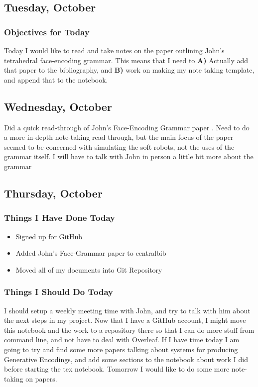 \documentclass[letterpaper,oneside,titlepage]{article}
\begin{document}
\subsection*{Tuesday, October }
\subsubsection*{Objectives for Today}
Today I would like to read and take notes on the paper outlining John's tetrahedral face-encoding grammar.  This means that I need to \textbf{A)} Actually add that paper to the bibliography, and \textbf{B)} work on making my note taking template, and append that to the notebook.

\subsection*{Wednesday, October }
Did a quick read-through of John's Face-Encoding Grammar paper \cite{Rieffel:face-grammar}.  Need to do a more in-depth note-taking read through, but the main focus of the paper seemed to be concerned with simulating the soft robots, not the uses of the grammar itself.  I will have to talk with John in person a little bit more about the grammar

\subsection*{Thursday, October }
\subsubsection*{Things I Have Done Today}
\begin{itemize}
\item Signed up for GitHub
\item Added John's Face-Grammar paper to centralbib
\item Moved all of my documents into Git Repository
\end{itemize}
\subsubsection*{Things I Should Do Today}
I should setup a weekly meeting time with John, and try to talk with him about the next steps in my project.  Now that I have a GitHub account, I might move this notebook and the work to a repository there so that I can do more stuff from command line, and not have to deal with Overleaf.  If I have time today I am going to try and find some more papers talking about systems for producing Generative Encodings, and add some sections to the notebook about work I did before starting the tex notebook.  Tomorrow I would like to do some more note-taking on papers.
\end{document}
